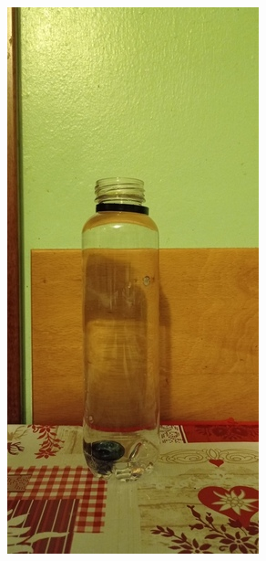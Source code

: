 \documentclass{report} \usepackage[T1]{fontenc} \usepackage[italian]{babel}
\begin{document}
\begin{figure}[H]
\begin{subfigure}[b]{0.3\textwidth}
  \end{subfigure}
  \begin{subfigure}[b]{0.3\textwidth}
  \includegraphics[width=\textwidth]{acqua}

\end{subfigure}
\end{figure}
\end{document}
